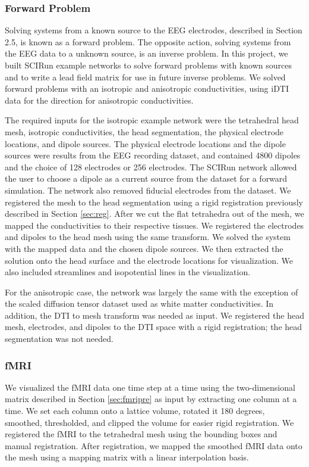 \subsubsection{Forward Problem}

Solving systems from a known source to the EEG electrodes, described in Section 2.5, is known as a forward problem. The opposite action, solving systems from the EEG data to a unknown source, is an inverse problem.  In this project, we built SCIRun example networks to solve forward problems with known sources and to write a lead field matrix for use in future inverse problems. We solved forward problems with an isotropic and anisotropic conductivities, using iDTI data for the direction for anisotropic conductivities.

The required inputs for the isotropic example network were the tetrahedral head mesh, isotropic conductivities, the head segmentation, the physical electrode locations, and dipole sources. The physical electrode locations and the dipole sources were results from the EEG recording dataset, and contained 4800 dipoles and the choice of 128 electrodes or 256 electrodes. The SCIRun network allowed the user to choose a dipole as a current source from the dataset for a forward simulation. The network also removed fiducial electrodes from the dataset. We registered the mesh to the head segmentation using a rigid registration previously described in Section \ref{sec:reg}. After we cut the flat tetrahedra out of the mesh, we mapped the conductivities to their respective tissues. We registered the electrodes and dipoles to the head mesh using the same transform. We solved the system with the mapped data and the chosen dipole sources. We then extracted the solution onto the head surface and the electrode locations for visualization. We also included streamlines and isopotential lines in the visualization.

For the anisotropic case, the network was largely the same with the exception of the scaled diffusion tensor dataset used as white matter conductivities. In addition, the DTI to mesh transform was needed as input. We registered the head mesh, electrodes, and dipoles to the DTI space with a rigid registration; the head segmentation was not needed.

\subsubsection{fMRI}

We visualized the fMRI data one time step at a time using the two-dimensional matrix described in Section \ref{sec:fmripre} as input by extracting one column at a time. We set each column onto a lattice volume, rotated it 180 degrees, smoothed, thresholded, and clipped the volume for easier rigid registration. We registered the fMRI to the tetrahedral mesh using the bounding boxes and manual registration. After registration, we mapped the smoothed fMRI data onto the mesh using a mapping matrix with a linear interpolation basis.

